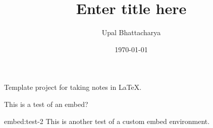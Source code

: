\documentclass[a4paper,colorinlistoftodos]{article}
\author{Upal Bhattacharya}
\date{\today}
\title{Enter title here}
\begin{document}
\maketitle

\begingroup
    \hypersetup{linkcolor=black}
    \tableofcontents
    \pagebreak
\endgroup

\linenumbers

Template project for taking notes in \LaTeX.

\begin{scontents}[store-env=embed:test,print-env=true]
  \label{embed:test}
  This is a test of an embed?
\end{scontents}

\begin{bembedsrc}{embed:test-2}
  This is another test of a custom embed environment.
  \end{bembedsrc}

\begin{tcolorbox}
\end{tcolorbox}




\pagebreak
\nolinenumbers
\appendix

\begingroup
    \hypersetup{linkcolor=black}
    \listoftodos
    \listofchanges
    \pagebreak
\endgroup
\end{document}
